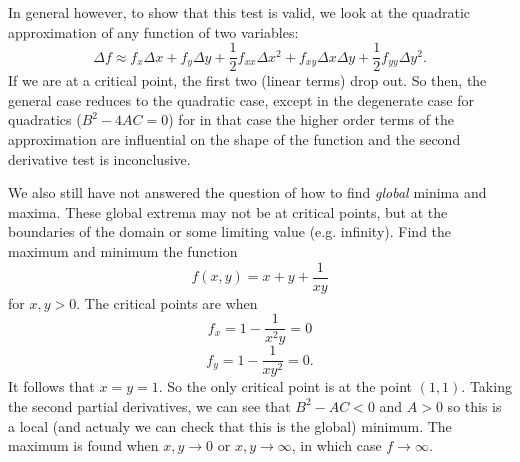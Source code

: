 In general however, to show that this test is valid, we look at the quadratic approximation of any function of two variables:
\[ \Delta f \approx f_x\Delta x + f_y \Delta y + \frac 12 f_{xx}\Delta x ^2 + f_{xy}\Delta x \Delta y + \frac 12 f_{yy}\Delta y^2. \]
If we are at a critical point, the first two (linear terms) drop out. So then, the general case reduces to the quadratic case, except in the degenerate case for quadratics ($B^2 - 4AC = 0$) for in that case the higher order terms of the approximation are influential on the shape of the function and the second derivative test is inconclusive. 

We also still have not answered the question of how to find \textit{global} minima and maxima. These global extrema may not be at critical points, but at the boundaries of the domain or some limiting value (e.g. infinity). 
\bex
Find the maximum and minimum the function 
\[ f(x,y)=x+y+\frac 1{xy} \]
for $x,y>0$. The critical points are when
\[ f_x = 1 - \frac{1}{x^2y} = 0 \]
\[ f_y = 1 - \frac{1}{xy^2} = 0. \]
It follows that $x = y = 1$. So the only critical point is at the point $(1,1)$. Taking the second partial derivatives, we can see that $B^2 - AC < 0$ and $A >0$ so this is a local (and actualy we can check that this is the global) minimum. The maximum is found when $x,y\to0$ or $x,y\to\infty$, in which case $f\to\infty$.
\eex